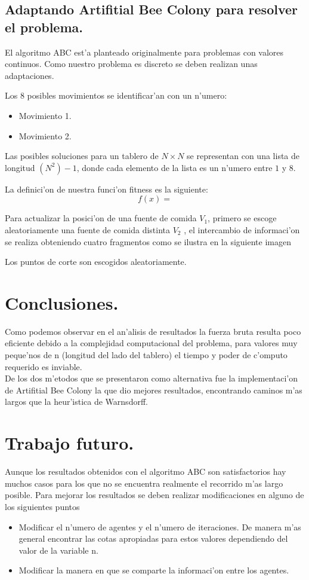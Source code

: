 \documentclass[12pt]{article}
\begin{document}
    \subsection{Adaptando Artifitial Bee Colony para resolver el problema.}

    El algoritmo ABC est'a planteado originalmente para problemas con valores continuos. Como nuestro problema es discreto
    se deben realizan unas adaptaciones.


    Los 8 posibles movimientos se identificar'an con un n'umero:
    \begin{itemize}
        \item Movimiento 1.
        \item Movimiento 2.
    \end{itemize}


    Las posibles  soluciones para un tablero de $N \times N$
    se representan con una lista de longitud $(N^{2}) -1 $, donde
    cada elemento de la lista es un n'umero entre $1$ y $8$.

    La definici'on de nuestra funci'on fitness es la siguiente:
    $$f(x) =  $$

    Para actualizar la posici'on de una fuente de comida $V_{1}$, primero se
    escoge aleatoriamente una fuente de comida distinta $V_{2}$ , el intercambio
    de informaci'on se realiza obteniendo cuatro fragmentos como se ilustra en
    la siguiente imagen

    Los puntos de corte son escogidos aleatoriamente.


    \section{Conclusiones.}
    Como podemos observar en el an'alisis de resultados la fuerza bruta
    resulta poco eficiente debido a la complejidad computacional del problema,
    para valores muy peque'nos de n (longitud del lado del tablero)
    el tiempo y poder de c'omputo requerido es inviable. \\
    De los  dos m'etodos que se presentaron como alternativa
    fue la implementaci'on de Artifitial Bee Colony la que dio mejores resultados,
    encontrando caminos m'as largos que la heur'istica de Warnsdorff. \\


    \section{Trabajo futuro.}
    Aunque los resultados obtenidos con el algoritmo ABC son satisfactorios
    hay muchos casos para los que no se encuentra realmente el recorrido m'as largo posible.
    Para mejorar los resultados se deben realizar modificaciones en alguno de los siguientes puntos
    \begin{itemize}
        \item Modificar el n'umero de agentes y el n'umero de iteraciones. De manera m'as general
            encontrar las cotas apropiadas para estos
            valores dependiendo del valor de la variable n.
        \item Modificar la manera en que se comparte la informaci'on entre los agentes.
    \end{itemize}
\end{document}
